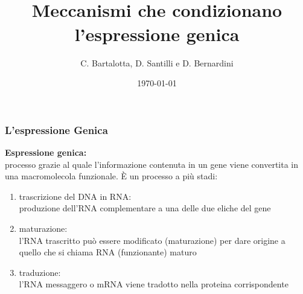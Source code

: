 \documentclass[hyperref={pdfpagelabels=false}]{beamer}
\title{\\Meccanismi che condizionano l'espressione genica\\}
\author{ C. Bartalotta, D. Santilli e D. Bernardini}
\date{\today}
\begin{document}


\begin{frame}
\titlepage
\end{frame}



\begin{frame}\frametitle{L'espressione Genica}
\textbf{Espressione genica:}\\
processo grazie al quale l'informazione contenuta in un gene viene convertita in una macromolecola funzionale.
\`E un processo a pi\`u stadi:\pause 
\begin{enumerate}
\item trascrizione del DNA in RNA:\\
produzione dell'RNA complementare a una delle due eliche del gene  \pause 
\item maturazione:\\
l'RNA trascritto pu\`o essere modificato (maturazione) per dare origine a quello che si chiama RNA (funzionante) maturo \pause 
\item traduzione:\\
l'RNA messaggero o mRNA viene tradotto nella proteina corrispondente
\end{enumerate}
\end{frame}
\end{document}
